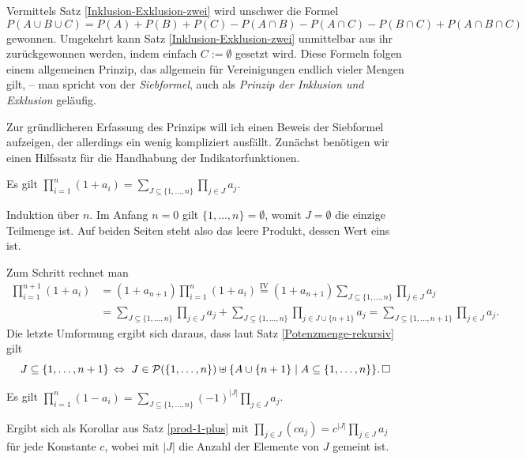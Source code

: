Vermittels Satz \ref{Inklusion-Exklusion-zwei} wird unschwer die Formel
\[P(A\cup B\cup C) = P(A) + P(B) + P(C)
- P(A\cap B) - P(A\cap C) - P(B\cap C) + P(A\cap B\cap C)\]
gewonnen. Umgekehrt kann Satz \ref{Inklusion-Exklusion-zwei} unmittelbar
aus ihr zurückgewonnen werden, indem einfach $C:=\emptyset$ gesetzt
wird. Diese Formeln folgen einem allgemeinen Prinzip, das
allgemein für Vereinigungen endlich vieler Mengen gilt, -- man spricht
von der \emph{Siebformel}, auch als \emph{Prinzip der Inklusion und Exklusion}
geläufig.

Zur gründlicheren Erfassung des Prinzips will ich einen Beweis
der Siebformel aufzeigen, der allerdings ein wenig kompliziert ausfällt.
Zunächst benötigen wir einen Hilfssatz für die Handhabung der
Indikatorfunktionen.

\begin{Satz}\label{prod-1-plus}
Es gilt $\prod_{i=1}^n (1+a_i) = \sum_{J\subseteq\{1,\ldots,n\}}\prod_{j\in J} a_j$.
\end{Satz}
\begin{Beweis}
Induktion über $n$. Im Anfang $n=0$ gilt $\{1,\ldots,n\}=\emptyset$,
womit $J=\emptyset$ die einzige Teilmenge ist. Auf beiden Seiten steht
also das leere Produkt, dessen Wert eins ist.

Zum Schritt rechnet man
\begin{align*}
\prod_{i=1}^{n+1} (1+a_i) &= (1+a_{n+1})\prod_{i=1}^n (1+a_i)
\stackrel{\mathrm{IV}}= (1+a_{n+1})\sum_{J\subseteq\{1,\ldots,n\}}\prod_{j\in J} a_j\\
&= \sum_{J\subseteq\{1,\ldots,n\}}\prod_{j\in J} a_j
+ \sum_{J\subseteq\{1,\ldots,n\}}\prod_{j\in J\cup\{n+1\}} a_j
= \sum_{J\subseteq\{1,\ldots,n+1\}}\prod_{j\in J} a_j.
\end{align*}
Die letzte Umformung ergibt sich daraus, dass laut Satz
\ref{Potenzmenge-rekursiv} gilt
\[J\subseteq\{1,\ldots,n+1\} \,\Leftrightarrow\,\,
J\in\mathcal P(\{1,\ldots,n\})\uplus\{A\cup\{n+1\}\mid A\subseteq\{1,\ldots,n\}\}.\,\Box\]
\end{Beweis}

\begin{Satz}\label{prod-1-minus}
Es gilt $\prod_{i=1}^n (1-a_i) = \sum_{J\subseteq\{1,\ldots,n\}}(-1)^{|J|}\prod_{j\in J} a_j$.
\end{Satz}
\begin{Beweis}
Ergibt sich als Korollar aus Satz \ref{prod-1-plus}
mit $\prod_{j\in J} (ca_j) = c^{|J|}\prod_{j\in J} a_j$
für jede Konstante $c$, wobei mit $|J|$ die Anzahl der Elemente von $J$ gemeint ist.\,\qedsymbol
\end{Beweis}

